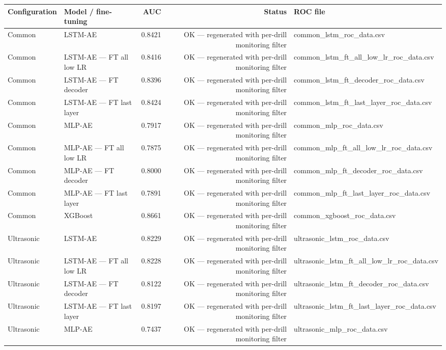 \begin{tabular}{llrrl}
\toprule
Configuration & Model / fine-tuning & AUC & Status & ROC file \\
\midrule
Common & LSTM-AE & 0.8421 & OK — regenerated with per-drill monitoring filter & common\_lstm\_roc\_data.csv \\
Common & LSTM-AE — FT all low LR & 0.8416 & OK — regenerated with per-drill monitoring filter & common\_lstm\_ft\_all\_low\_lr\_roc\_data.csv \\
Common & LSTM-AE — FT decoder & 0.8396 & OK — regenerated with per-drill monitoring filter & common\_lstm\_ft\_decoder\_roc\_data.csv \\
Common & LSTM-AE — FT last layer & 0.8424 & OK — regenerated with per-drill monitoring filter & common\_lstm\_ft\_last\_layer\_roc\_data.csv \\
Common & MLP-AE & 0.7917 & OK — regenerated with per-drill monitoring filter & common\_mlp\_roc\_data.csv \\
Common & MLP-AE — FT all low LR & 0.7875 & OK — regenerated with per-drill monitoring filter & common\_mlp\_ft\_all\_low\_lr\_roc\_data.csv \\
Common & MLP-AE — FT decoder & 0.8000 & OK — regenerated with per-drill monitoring filter & common\_mlp\_ft\_decoder\_roc\_data.csv \\
Common & MLP-AE — FT last layer & 0.7891 & OK — regenerated with per-drill monitoring filter & common\_mlp\_ft\_last\_layer\_roc\_data.csv \\
Common & XGBoost & 0.8661 & OK — regenerated with per-drill monitoring filter & common\_xgboost\_roc\_data.csv \\
Ultrasonic & LSTM-AE & 0.8229 & OK — regenerated with per-drill monitoring filter & ultrasonic\_lstm\_roc\_data.csv \\
Ultrasonic & LSTM-AE — FT all low LR & 0.8228 & OK — regenerated with per-drill monitoring filter & ultrasonic\_lstm\_ft\_all\_low\_lr\_roc\_data.csv \\
Ultrasonic & LSTM-AE — FT decoder & 0.8122 & OK — regenerated with per-drill monitoring filter & ultrasonic\_lstm\_ft\_decoder\_roc\_data.csv \\
Ultrasonic & LSTM-AE — FT last layer & 0.8197 & OK — regenerated with per-drill monitoring filter & ultrasonic\_lstm\_ft\_last\_layer\_roc\_data.csv \\
Ultrasonic & MLP-AE & 0.7437 & OK — regenerated with per-drill monitoring filter & ultrasonic\_mlp\_roc\_data.csv \\

\end{tabular}

